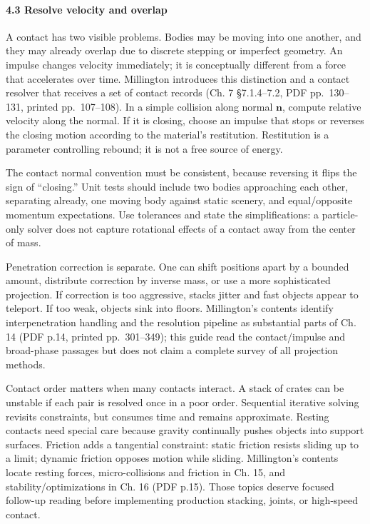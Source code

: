 \paragraph{4.3 Resolve velocity and overlap}\label{06-engine-ii-ch033-resolve-velocity-and-overlap}

\hypertarget{06-engine-ii-ch033-resolve-velocity-and-overlap}{}

A contact has two visible problems. Bodies may be moving into one another, and they may already overlap due to discrete stepping or imperfect geometry. An impulse changes velocity immediately; it is conceptually different from a force that accelerates over time. Millington introduces this distinction and a contact resolver that receives a set of contact records (Ch. 7 §7.1.4--7.2, PDF pp.~130--131, printed pp.~107--108). In a simple collision along normal \(\mathbf{n}\), compute relative velocity along the normal. If it is closing, choose an impulse that stops or reverses the closing motion according to the material's restitution. Restitution is a parameter controlling rebound; it is not a free source of energy.

The contact normal convention must be consistent, because reversing it flips the sign of ``closing.'' Unit tests should include two bodies approaching each other, separating already, one moving body against static scenery, and equal/opposite momentum expectations. Use tolerances and state the simplifications: a particle-only solver does not capture rotational effects of a contact away from the center of mass.

Penetration correction is separate. One can shift positions apart by a bounded amount, distribute correction by inverse mass, or use a more sophisticated projection. If correction is too aggressive, stacks jitter and fast objects appear to teleport. If too weak, objects sink into floors. Millington's contents identify interpenetration handling and the resolution pipeline as substantial parts of Ch. 14 (PDF p.14, printed pp.~301--349); this guide read the contact/impulse and broad-phase passages but does not claim a complete survey of all projection methods.

Contact order matters when many contacts interact. A stack of crates can be unstable if each pair is resolved once in a poor order. Sequential iterative solving revisits constraints, but consumes time and remains approximate. Resting contacts need special care because gravity continually pushes objects into support surfaces. Friction adds a tangential constraint: static friction resists sliding up to a limit; dynamic friction opposes motion while sliding. Millington's contents locate resting forces, micro-collisions and friction in Ch. 15, and stability/optimizations in Ch. 16 (PDF p.15). Those topics deserve focused follow-up reading before implementing production stacking, joints, or high-speed contact.

